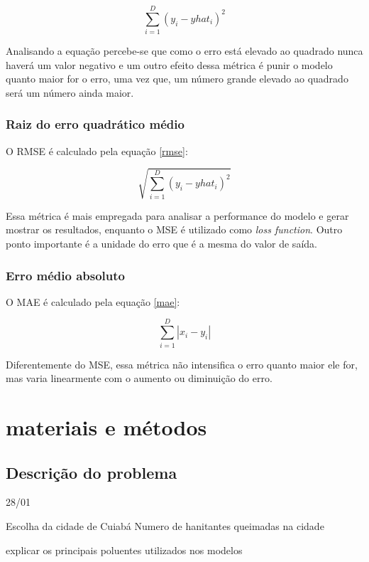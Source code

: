 \documentclass[
  12pt,		%
  a4paper,	%
  openright,%
  oneside,	%
  chapter=TITLE,		%
  section=TITLE,		%
  english,	%
  french,	%
  spanish,	%
  brazil	%
]{abntex2}
\begin{document}
    \begin{equation}
        \label{mse}
        \sum_{i=1}^{D}(y_i-yhat_i)^2
    \end{equation}

    Analisando a equação percebe-se que como o erro está elevado ao quadrado nunca haverá um valor negativo e
    um outro efeito dessa métrica é punir o modelo quanto maior for o erro, uma vez que, um número grande elevado ao quadrado
    será um número ainda maior.
    
    \subsection{Raiz do erro quadrático médio}
    O RMSE é calculado pela equação \ref*{rmse}: 

    \begin{equation}
        \label{rmse}
        \sqrt{\sum_{i=1}^{D}(y_i-yhat_i)^2}
    \end{equation}
    
    Essa métrica é mais empregada para analisar a performance do modelo e gerar mostrar os resultados, enquanto o
    MSE é utilizado como \textit{loss function}. Outro ponto importante é a unidade do erro que é a mesma do valor de saída.
    \subsection{Erro médio absoluto}
    O MAE é calculado pela equação \ref*{mae}: 

    \begin{equation}
        \label{mae}
        \sum_{i=1}^{D}|x_i-y_i|
    \end{equation}

    Diferentemente do MSE, essa métrica não intensifica o erro quanto maior ele for, mas varia linearmente com o aumento
    ou diminuição do erro.
    
    \chapter{materiais e métodos}

    \section{Descrição do problema}
    28/01

    Escolha da cidade de Cuiabá
    Numero de hanitantes
    queimadas na cidade

    explicar os principais poluentes utilizados nos modelos
\end{document}
